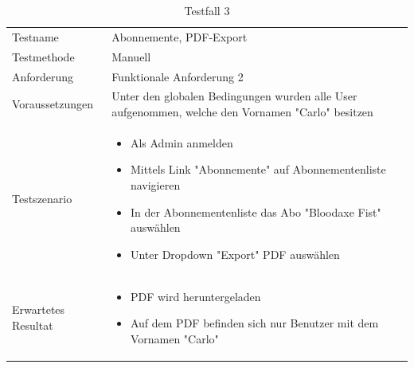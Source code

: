 \begin{table}[h!]
   \begin{tabular}{|L{0.4\textwidth}|L{0.6\textwidth}|}
       \hline
         \\[12pt]
       \hline
        Testname & Abonnemente, PDF-Export \\
       \hline
       Testmethode & Manuell \\
       \hline
        Anforderung & Funktionale Anforderung 2 \\
       \hline
       Voraussetzungen & Unter den globalen Bedingungen wurden alle User aufgenommen, welche den Vornamen
       "Carlo" besitzen \\
       \hline
       Testszenario & 
       \begin{itemize}
         \item Als Admin anmelden
         \item Mittels Link "Abonnemente" auf Abonnementenliste navigieren
         \item In der Abonnementenliste das Abo "Bloodaxe Fist" auswählen
         \item Unter Dropdown "Export" PDF auswählen
       \end{itemize} \\
       \hline
       Erwartetes Resultat & 
       \begin{itemize}
         \item PDF wird heruntergeladen
         \item Auf dem PDF befinden sich nur Benutzer mit dem Vornamen "Carlo"
      \end{itemize}\\
      \hline
     \end{tabular}
     \caption{Testfall 3}
\end{table}

\newpage

